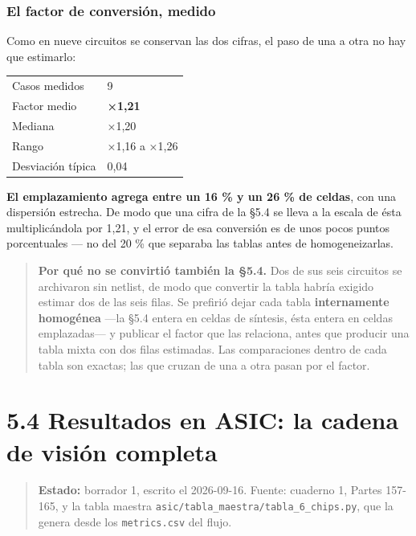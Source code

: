 \subsubsection{El factor de conversión,
medido}\label{el-factor-de-conversiuxf3n-medido}

Como en nueve circuitos se conservan las dos cifras, el paso de una a
otra no hay que estimarlo:

\begin{longtable}[]{@{}ll@{}}
\toprule\noalign{}
\endhead
\bottomrule\noalign{}
\endlastfoot
Casos medidos & 9 \\
Factor medio & \textbf{×1,21} \\
Mediana & ×1,20 \\
Rango & ×1,16 a ×1,26 \\
Desviación típica & 0,04 \\
\end{longtable}

\textbf{El emplazamiento agrega entre un 16 \% y un 26 \% de celdas},
con una dispersión estrecha. De modo que una cifra de la §5.4 se lleva a
la escala de ésta multiplicándola por 1,21, y el error de esa conversión
es de unos pocos puntos porcentuales --- no del 20 \% que separaba las
tablas antes de homogeneizarlas.

\begin{quote}
\textbf{Por qué no se convirtió también la §5.4.} Dos de sus seis
circuitos se archivaron sin netlist, de modo que convertir la tabla
habría exigido estimar dos de las seis filas. Se prefirió dejar cada
tabla \textbf{internamente homogénea} ---la §5.4 entera en celdas de
síntesis, ésta entera en celdas emplazadas--- y publicar el factor que
las relaciona, antes que producir una tabla mixta con dos filas
estimadas. Las comparaciones dentro de cada tabla son exactas; las que
cruzan de una a otra pasan por el factor.
\end{quote}

\section{5.4 Resultados en ASIC: la cadena de visión
completa}\label{resultados-en-asic-la-cadena-de-visiuxf3n-completa}

\begin{quote}
\textbf{Estado:} borrador 1, escrito el 2026-09-16. Fuente: cuaderno 1,
Partes 157-165, y la tabla maestra
\texttt{asic/tabla\_maestra/tabla\_6\_chips.py}, que la genera desde los
\texttt{metrics.csv} del flujo.
\end{quote}

